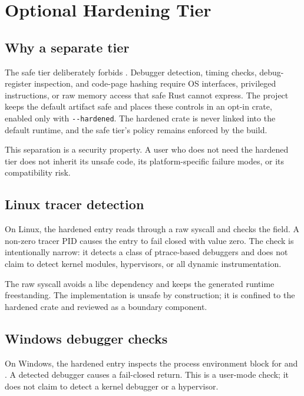 \section{Optional Hardening Tier}
\label{sec:hardening}

\subsection{Why a separate tier}

The safe tier deliberately forbids . Debugger detection, timing
checks, debug-register inspection, and code-page hashing require OS interfaces,
privileged instructions, or raw memory access that safe Rust cannot express. The
project keeps the default artifact safe and places these controls in an opt-in
 crate, enabled only with \verb|--hardened|. The hardened
crate is never linked into the default runtime, and the safe tier's
 policy remains enforced by the build.

This separation is a security property. A user who does not need the hardened
tier does not inherit its unsafe code, its platform-specific failure modes, or
its compatibility risk.

\subsection{Linux tracer detection}

On Linux, the hardened entry reads  through a raw
syscall and checks the  field. A non-zero tracer PID causes the
entry to fail closed with value zero. The check is intentionally narrow: it
detects a class of ptrace-based debuggers and does not claim to detect kernel
modules, hypervisors, or all dynamic instrumentation.

The raw syscall avoids a libc dependency and keeps the generated runtime
freestanding. The implementation is unsafe by construction; it is confined to
the hardened crate and reviewed as a boundary component.

\subsection{Windows debugger checks}

On Windows, the hardened entry inspects the process environment block for
 and . A detected debugger causes a
fail-closed return. This is a user-mode check; it does not claim to detect a
kernel debugger or a hypervisor.

